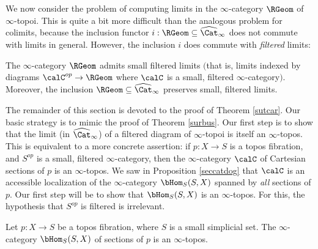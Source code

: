 We now consider the problem of computing limits in the $\infty$-category $\RGeom$ of $\infty$-topoi. This is quite a bit more difficult than the analogous problem for colimits, because the inclusion functor
$i: \RGeom \subseteq \widehat{\Cat}_{\infty}$ does not commute with limits in general.
However, the inclusion $i$ does commute with {\em filtered} limits:

\begin{theorem}\label{sutcar}
The $\infty$-category $\RGeom$ admits small filtered limits $($that is, limits indexed by diagrams
$\calC^{op} \rightarrow \RGeom$ where $\calC$ is a small, filtered $\infty$-category$)$. Moreover, the inclusion $\RGeom \subseteq \widehat{\Cat}_{\infty}$ preserves small, filtered limits.
\end{theorem}

The remainder of this section is devoted to the proof of Theorem \ref{sutcar}. Our basic strategy is to mimic the proof of Theorem \ref{surbus}. Our first step is to show that the limit (in $\widehat{\Cat}_{\infty}$) of a filtered diagram of $\infty$-topoi is itself an $\infty$-topos. This is equivalent to a more concrete assertion: if $p: X \rightarrow S$ is a topos fibration, and
$S^{op}$ is a small, filtered $\infty$-category, then the $\infty$-category $\calC$ of Cartesian sections of $p$ is an $\infty$-topos. We saw in Proposition \ref{seccatdog} that
$\calC$ is an accessible localization of the $\infty$-category $\bHom_{S}(S,X)$ spanned by
{\em all} sections of $p$. Our first step will be to show that $\bHom_{S}(S,X)$ is an $\infty$-topos. For this, the hypothesis that $S^{op}$ is filtered is irrelevant.

\begin{lemma}
Let $p: X \rightarrow S$ be a topos fibration, where $S$ is a small simplicial set. The
$\infty$-category $\bHom_{S}(S,X)$ of sections of $p$ is an $\infty$-topos.
\end{lemma}

